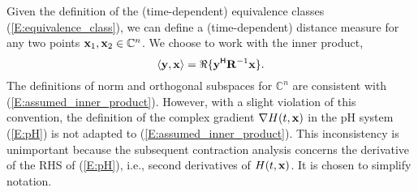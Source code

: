 Given the definition of the (time-dependent) equivalence classes (\ref{E:equivalence_class}), we can define a (time-dependent) distance measure for any two points $\mathbf{x}_1, \mathbf{x}_2 \in \mathbb{C}^n$. 
We choose to work with the inner product, 
\begin{equation} \label{E:assumed_inner_product}
    \langle \mathbf{y}, \mathbf{x} \rangle = \Re\{\mathbf{y}^{\mathsf{H}} \mathbf{R}^{-1} \mathbf{x} \}. 
\end{equation}
The definitions of norm and orthogonal subspaces for $\mathbb{C}^n$ are consistent with (\ref{E:assumed_inner_product}). However, with a slight violation of this convention, the definition of the complex gradient $\nabla H(t, \mathbf{x})$ in the pH system (\ref{E:pH}) is not adapted to (\ref{E:assumed_inner_product}). This inconsistency is unimportant because the subsequent contraction analysis concerns the derivative of the RHS of (\ref{E:pH}), i.e., second derivatives of $H(t, \mathbf{x})$. It is chosen to simplify notation.

